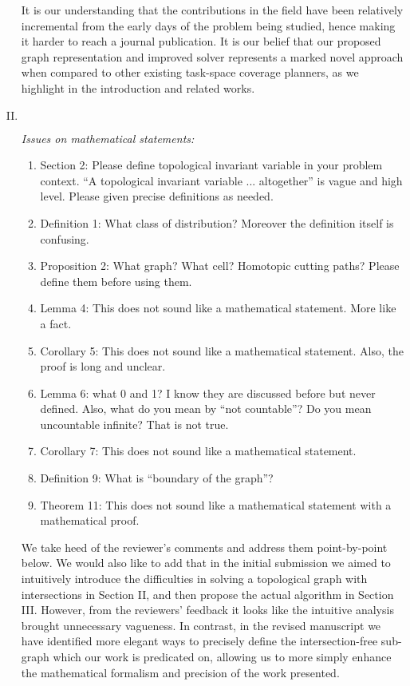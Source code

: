 \documentclass[11pt]{article}
\newenvironment{reviewer}
{\begin{mdframed}[roundcorner = 10pt,fontcolor=blue!70!black]\itshape}
{\end{mdframed}}
\begin{document}
\begin{enumerate}[I.]
It is our understanding that the contributions in the field have been relatively incremental from the early days of the problem being studied, hence making it harder to reach a journal publication. It is our belief that our proposed graph representation and improved solver represents a marked novel approach when compared to other existing task-space coverage planners, as we highlight in the introduction and related works.
  
\newpage

  \item $ $
  \begin{reviewer}
  Issues on mathematical statements: 
\begin{enumerate}
\item Section 2: Please define topological invariant variable in your problem context. “A topological invariant variable ... altogether” is vague and high level. Please given precise definitions as needed. 
\item Definition 1: What class of distribution? Moreover the definition itself is confusing. 
\item Proposition 2: What graph? What cell? Homotopic cutting paths? Please define them before using them. 
\item Lemma 4: This does not sound like a mathematical statement. More like a fact. 
\item Corollary 5: This does not sound like a mathematical statement. Also, the proof is long and unclear. 
\item Lemma 6: what 0 and 1? I know they are discussed before but never defined. Also, what do you mean by “not countable”? Do you mean uncountable infinite? That is not true. 
\item Corollary 7: This does not sound like a mathematical statement. 
\item Definition 9: What is “boundary of the graph”? 
\item Theorem 11: This does not sound like a mathematical statement with a mathematical proof. 
\end{enumerate}

\end{reviewer}

\noindent
We take heed of the reviewer's comments and address them point-by-point below. 
We would also like to add that in the initial submission we aimed to intuitively introduce the difficulties in solving a topological graph with intersections in Section II, 
and then propose the actual algorithm in Section III. However, from the reviewers' feedback it looks like the intuitive analysis brought unnecessary vagueness. 
In contrast, in the revised manuscript we have identified more elegant ways to precisely define the intersection-free sub-graph which our work is predicated on, 
allowing us to more simply enhance the mathematical formalism and precision of the work presented. 


\end{enumerate}
\end{document}
